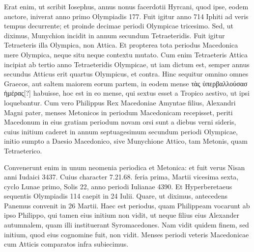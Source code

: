 Erat enim,
ut scribit Iosephus, annus nonus facerdotii Hyrcani, quod ipse, eodem
auctore, iniverat anno primo Olympiadis 177.
Fuit igitur anno 714
Iphiti ad veris tempus decurrente; et proinde decimae periodi Olympicae
tricesimo.
Sed, ut diximus, Munychion incidit in annum
secundum Tetraeteridis.
Fuit igitur Tetraeteris illa Olympica,
non Attica.
Et propterea tota periodus Macedonica mere Olympica,
neque situ neque contextu mutato.
%
Cum enim Tetraeteris Attica
incipiat ab tertio anno Tetraeteridis Olympicae, ut iam dictum est, semper
annus secundus Atticus erit quartus Olympicus, et contra.
Hinc
sequitur omnino omnes Graecos, aut saltem maiorem eorum partem,
in eodem mense \textgreek{τὰς ὑπερβαλλούσασ ἡμέρας[?]}
 habuisse, hoc est in eo
mense, qui sextus esset a Tropico aestivo, ut ipsi loquebantur.
Cum
vero Philippus Rex Macedoniae Amyntae filius, Alexandri Magni
pater, menses Metonicos in periodum Macedonicam recepisset,
periti Macedonum in eius gratiam periodum novam orsi sunt a diebus
verni sideris, cuius initium caderet in annum septuagesimum
secundum periodi Olympicae, initio sumpto a Daesio Macedonico,
sive Munychione Attico, tam Metonis, quam Tetraeterico.
\begin{table}[htbp]
  
\end{table}
Convenerunt enim in unum neomenia periodica et
Metonica: et fuit verus Nisan anni Iudaici
3437.
Cuius character 7.21.68. feria prima,
Martii vicesima sexta, cyclo Lunae primo,
Solis 22, anno periodi Iulianae 4390.
Et
Hyperberetaeus sequentis Olympiadis 114
caepit in 24 Iulii.
Quare, ut diximus, antecedens
Panemus convenit in 26 Martii.
Haec
est periodus, quam Philippeam vocarunt ab
ipso Philippo, qui tamen eius initium non
vidit, ut neque filius eius Alexander autumnalem,
quam illi instituerant Syromacedones.
Nam vidit quidem finem, sed initium, quod eius cognomine fuit, non
vidit.
Menses periodi veteris Macedonicae cum Atticis comparatos
infra subiecimus.
